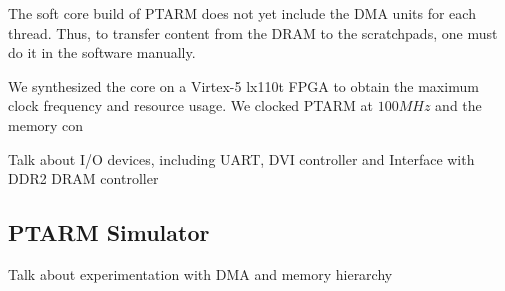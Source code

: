 The soft core build of PTARM does not yet include the DMA units for each thread.
Thus, to transfer content from the DRAM to the scratchpads, one must do it in the software manually. 

We synthesized the core on a Virtex-5 lx110t FPGA to obtain the maximum clock frequency and resource usage. 
We clocked PTARM at $100MHz$ and the memory con

 
Talk about I/O devices, including UART, DVI controller and Interface with DDR2 DRAM controller

\subsection{PTARM Simulator}
\label{sec:ptarm_sim}

Talk about experimentation with DMA and memory hierarchy
